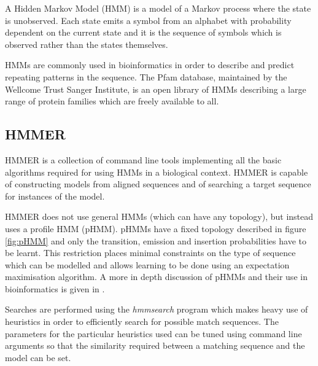 A Hidden Markov Model (HMM) is a model of a Markov process where the state is
unobserved.
Each state emits a symbol from an alphabet with probability dependent on the 
current state and it is the sequence of symbols which is observed rather than
the states themselves. 

HMMs are commonly used in bioinformatics in order to describe and predict
repeating patterns in the sequence\cite{Durbin1998}.
The Pfam database, maintained by the Wellcome Trust Sanger Institute,
is an open library of HMMs describing a large range of protein families which
are freely available to all.

\subsection{HMMER}
\label{ssec:hmmer}

HMMER is a collection of command line tools implementing all the basic
algorithms required for using HMMs in a biological context\cite{HMMERguide}.
HMMER is capable of constructing models from aligned sequences and of searching
a target sequence for instances of the model.

HMMER does not use general HMMs (which can have any topology), but instead uses
a profile HMM (pHMM).
pHMMs have a fixed topology described in figure \ref{fig:pHMM} and only the 
transition, emission and insertion probabilities have to be learnt.
This restriction places minimal constraints on the type of sequence which can
be modelled and allows learning to be done using an expectation maximisation
algorithm. A more in depth discussion of pHMMs and their use in bioinformatics
is given in \cite{Durbin1998}.

Searches are performed using the \emph{hmmsearch} program which makes heavy use
of heuristics in order to efficiently search for possible match sequences.
The parameters for the particular heuristics used can be tuned using command
line arguments so that the similarity required between a matching sequence 
and the model can be set.


